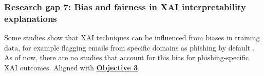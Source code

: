 
\subsubsection*{Research gap 7: Bias and fairness in XAI interpretability explanations}\label{research-gap-7}
Some studies show that XAI techniques can be influenced from biases in training data, for example flagging emails from specific domains as phishing by default \citep{hanif2021survey}. As of now, there are no studies that account for this bias for phishing-specific XAI outcomes. Aligned with \hyperref[objective-3]{\uline{\textbf{Objective 3}}}.

